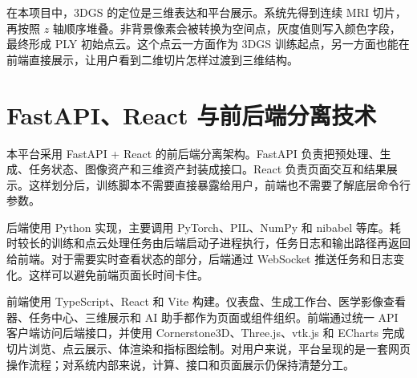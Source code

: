 在本项目中，3DGS 的定位是三维表达和平台展示。系统先得到连续 MRI 切片，再按照 $z$ 轴顺序堆叠。非背景像素会被转换为空间点，灰度值则写入颜色字段，最终形成 PLY 初始点云。这个点云一方面作为 3DGS 训练起点，另一方面也能在前端直接展示，让用户看到二维切片怎样过渡到三维结构。

\section{FastAPI、React 与前后端分离技术}
本平台采用 FastAPI + React 的前后端分离架构。FastAPI 负责把预处理、生成、任务状态、图像资产和三维资产封装成接口。React 负责页面交互和结果展示。这样划分后，训练脚本不需要直接暴露给用户，前端也不需要了解底层命令行参数。

后端使用 Python 实现，主要调用 PyTorch、PIL、NumPy 和 nibabel 等库。耗时较长的训练和点云处理任务由后端启动子进程执行，任务日志和输出路径再返回给前端。对于需要实时查看状态的部分，后端通过 WebSocket 推送任务和日志变化。这样可以避免前端页面长时间卡住。

前端使用 TypeScript、React 和 Vite 构建。仪表盘、生成工作台、医学影像查看器、任务中心、三维展示和 AI 助手都作为页面或组件组织。前端通过统一 API 客户端访问后端接口，并使用 Cornerstone3D、Three.js、vtk.js 和 ECharts 完成切片浏览、点云展示、体渲染和指标图绘制。对用户来说，平台呈现的是一套网页操作流程；对系统内部来说，计算、接口和页面展示仍保持清楚分工。
